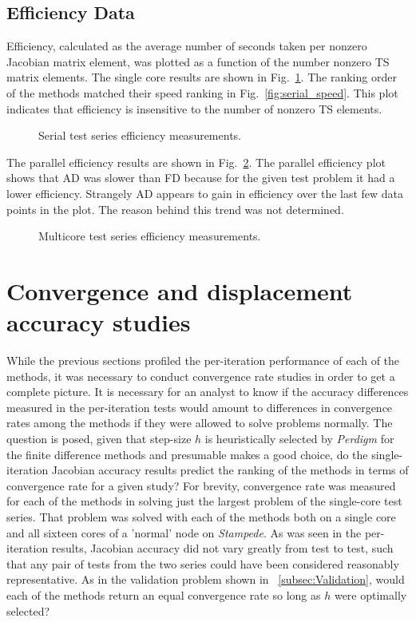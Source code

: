 \documentclass[preprint,12pt]{elsarticle}
\begin{document}
\subsection{Efficiency Data}
Efficiency, calculated as the average number of seconds taken per nonzero Jacobian matrix element, was plotted as a function of the number nonzero TS matrix elements. The single core results are shown in Fig.~\ref{fig:serial_efficiency}.  The ranking order of the methods
matched their speed ranking in Fig.~\ref{fig:serial_speed}. This plot indicates that efficiency is insensitive to the number of nonzero TS elements.  
%
\begin{figure}[tbp]
  \centering
  \scalebox{1.0}{}
  \caption{Serial test series efficiency measurements.}
  \label{fig:serial_efficiency}
\end{figure}
%
The parallel efficiency results are shown in Fig.~\ref{fig:multi_efficiency}. The parallel efficiency plot shows that AD was slower than FD because for the given test problem it had a lower efficiency. Strangely AD appears to gain in efficiency over the last few data points in the plot. The reason behind this trend was not determined.
%
\begin{figure}[tbp]
  \centering
  \scalebox{1.0}{}
  \caption{Multicore test series efficiency measurements.}
  \label{fig:multi_efficiency}
\end{figure}

\section{Convergence and displacement accuracy studies} 
\label{sec:PeridigmConvergenceStudy}
%
While the previous sections profiled the per-iteration performance of each of
the methods, it was necessary to conduct convergence rate studies in order to
get a complete picture. It is necessary for an analyst to know if the
accuracy differences measured in the per-iteration tests would amount to
differences in convergence rates among the methods if they were allowed to solve problems
normally. The question is posed, given that step-size $h$ is heuristically
selected by \emph{Perdigm} for the finite difference methods and presumable
makes a good choice, do the single-iteration Jacobian accuracy results predict
the ranking of the methods in terms of convergence rate for a given study? For
brevity, convergence rate was measured for each of the methods in solving just
the largest problem of the single-core test series. That problem was solved with each of the methods
both on a single core and all sixteen cores of a 'normal' node on \emph{Stampede}. As was seen in the per-iteration results,
Jacobian accuracy did not vary greatly from test to test, such that any pair of tests
from the two series could have been considered reasonably representative. As in
the validation problem shown in ~\ref{subsec:Validation}, would each of the methods return an
equal convergence rate so long as $h$ were optimally selected? 
\end{document}
